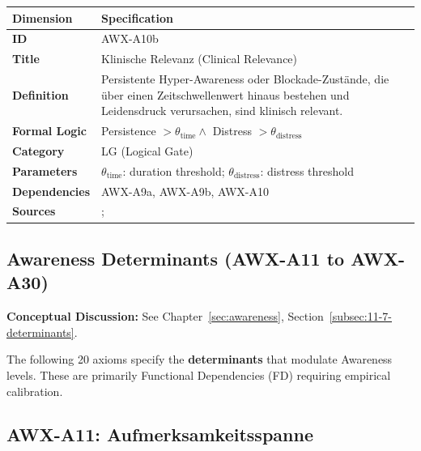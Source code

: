 \begin{table}[htbp]
\small
\begin{tabular}{p{3cm}p{11cm}}
\toprule
\textbf{Dimension} & \textbf{Specification} \\
\midrule
\textbf{ID} & AWX-A10b \\
\textbf{Title} & Klinische Relevanz (Clinical Relevance) \\
\textbf{Definition} & Persistente Hyper-Awareness oder Blockade-Zustände, die über einen Zeitschwellenwert hinaus bestehen und Leidensdruck verursachen, sind klinisch relevant. \\
\textbf{Formal Logic} & Persistence $> \theta_{\text{time}} \land$ Distress $> \theta_{\text{distress}}$ \\
\textbf{Category} & LG (Logical Gate) \\
\textbf{Parameters} & $\theta_{\text{time}}$: duration threshold; $\theta_{\text{distress}}$: distress threshold \\
\textbf{Dependencies} & AWX-A9a, AWX-A9b, AWX-A10 \\
\textbf{Sources} & \citet{PAP-laibson2003projection}; \citet{loewenstein2001risk} \\
\bottomrule
\end{tabular}
\end{table}



\subsection{Awareness Determinants (AWX-A11 to AWX-A30)}

\begin{cross-reference}
\textbf{Conceptual Discussion:} See Chapter~\ref{sec:awareness}, Section~\ref{subsec:11-7-determinants}.
\end{cross-reference}
The following 20 axioms specify the \textbf{determinants} that modulate Awareness levels. These are primarily Functional Dependencies (FD) requiring empirical calibration.


\subsection{AWX-A11: Aufmerksamkeitsspanne}

